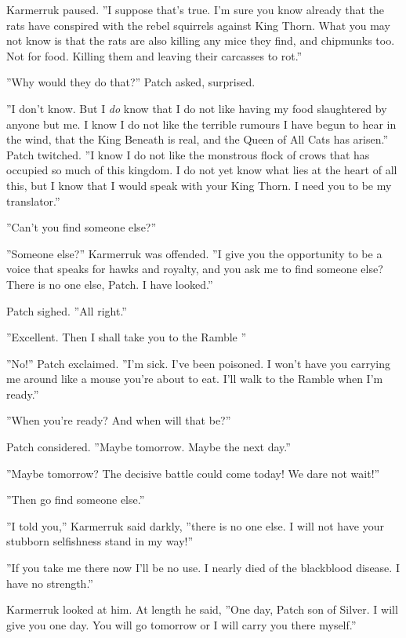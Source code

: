 \documentclass[12pt]{book}
\begin{document}
 Karmerruk paused. ''I suppose that's true. I'm sure you know already that the rats have conspired with the rebel squirrels against King Thorn. What you may not know is that the rats are also killing any mice they find, and chipmunks too. Not for food. Killing them and leaving their carcasses to rot.''\par
 ''Why would they do that?'' Patch asked, surprised.\par
 ''I don't know. But I {\it do} know that I do not like having my food slaughtered by anyone but me. I know I do not like the terrible rumours I have begun to hear in the wind, that the King Beneath is real, and the Queen of All Cats has arisen.'' Patch twitched. ''I know I do not like the monstrous flock of crows that has occupied so much of this kingdom. I do not yet know what lies at the heart of all this, but I know that I would speak with your King Thorn. I need you to be my translator.''\par
 ''Can't you find someone else?''\par
 ''Someone else?'' Karmerruk was offended. ''I give you the opportunity to be a voice that speaks for hawks and royalty, and you ask me to find someone else? There is no one else, Patch. I have looked.''\par
 Patch sighed. ''All right.''\par
 ''Excellent. Then I shall take you to the Ramble %
''\par
 ''No!'' Patch exclaimed. ''I'm sick. I've been poisoned. I won't have you carrying me around like a mouse you're about to eat. I'll walk to the Ramble when I'm ready.''\par
 ''When you're ready? And when will that be?''\par
 Patch considered. ''Maybe tomorrow. Maybe the next day.''\par
 ''Maybe tomorrow? The decisive battle could come today! We dare not wait!''\par
 ''Then go find someone else.''\par
 ''I told you,'' Karmerruk said darkly, ''there is no one else. I will not have your stubborn selfishness stand in my way!''\par
 ''If you take me there now I'll be no use. I nearly died of the blackblood disease. I have no strength.''\par
 Karmerruk looked at him. At length he said, ''One day, Patch son of Silver. I will give you one day. You will go tomorrow or I will carry you there myself.''\par
\end{document}
